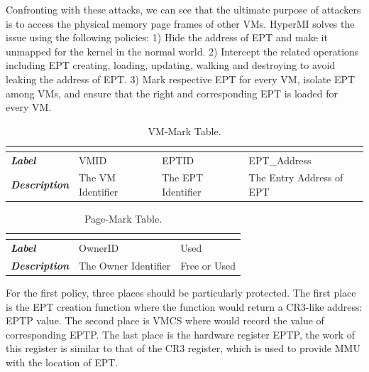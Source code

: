 \documentclass[conference]{IEEEtran}
\begin{document}
Confronting with these attacks, we can see that the ultimate purpose of attackers is to access the physical memory page frames of other VMs. HyperMI solves the issue using the following policies: 1) Hide the address of EPT and make it unmapped for the kernel in the normal world. 2) Intercept the related operations including EPT creating, loading, updating, walking and destroying to avoid leaking the address of EPT. 3) Mark respective EPT for every VM, isolate EPT among VMs, and ensure that the right and corresponding EPT is loaded for every VM.







\begin{table}[htbp]
\centering
\caption{VM-Mark Table.}\label{tab1}
\begin{tabular}{p{1.4cm}|p{1.2cm}|p{1.1cm}|p{1.7cm}}
\hline
\multicolumn{4}{c}{\bfseries\textbf\centering{VM-Mark Table}}\\
\hline
{\itshape\bfseries Label} & VMID & EPTID & EPT\_Address\\
\hline
{\itshape\bfseries Description} & { The VM Identifier} & The EPT Identifier & The Entry Address of EPT\\
\hline
\end{tabular}
\end{table}

\begin{table}
\centering
\caption{Page-Mark Table.}\label{tab2}
\begin{tabular}{p{1.2cm}|p{1.4cm}|p{1.5cm}}
\hline
\multicolumn{3}{c}{\bfseries\textbf\centering{Page-Mark Table}}\\
\hline
{\itshape\bfseries Label} & OwnerID & Used \\
\hline
{\itshape\bfseries Description} & The Owner Identifier & Free or Used \\
\hline
\end{tabular}
\end{table}

For the first policy, three places should be particularly protected. The first place is the EPT creation function where the function would return a CR3-like address: EPTP value. The second place is VMCS where would record the value of corresponding EPTP. The last place is the hardware register EPTP, the work of this register is similar to that of the CR3 register, which is used to provide MMU with the location of EPT. 
\end{document}
